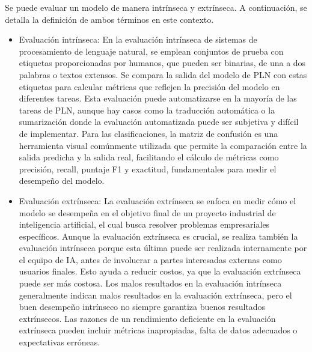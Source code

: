 Se puede evaluar un modelo de manera intrínseca y extrínseca. A continuación, se detalla la definición de ambos términos en este contexto.

\begin{itemize}

\item Evaluación intrínseca:  En la evaluación intrínseca de sistemas de procesamiento de lenguaje natural, se emplean conjuntos de prueba con etiquetas proporcionadas por humanos, que pueden ser binarias, de una a dos palabras o textos extensos. Se compara la salida del modelo de PLN con estas etiquetas para calcular métricas que reflejen la precisión del modelo en diferentes tareas. Esta evaluación puede automatizarse en la mayoría de las tareas de PLN, aunque hay casos como la traducción automática o la sumarización donde la evaluación automatizada puede ser subjetiva y difícil de implementar. Para las clasificaciones, la matriz de confusión es una herramienta visual comúnmente utilizada que permite la comparación entre la salida predicha y la salida real, facilitando el cálculo de métricas como precisión, recall, puntaje F1 y exactitud, fundamentales para medir el desempeño del modelo.


\item Evaluación extrínseca: La evaluación extrínseca se enfoca en medir cómo el modelo se desempeña en el objetivo final de un proyecto industrial de inteligencia artificial, el cual busca resolver problemas empresariales específicos. Aunque la evaluación extrínseca es crucial, se realiza también la evaluación intrínseca porque esta última puede ser realizada internamente por el equipo de IA, antes de involucrar a partes interesadas externas como usuarios finales. Esto ayuda a reducir costos, ya que la evaluación extrínseca puede ser más costosa. Los malos resultados en la evaluación intrínseca generalmente indican malos resultados en la evaluación extrínseca, pero el buen desempeño intrínseco no siempre garantiza buenos resultados extrínsecos. Las razones de un rendimiento deficiente en la evaluación extrínseca pueden incluir métricas inapropiadas, falta de datos adecuados o expectativas erróneas.

\end{itemize}
